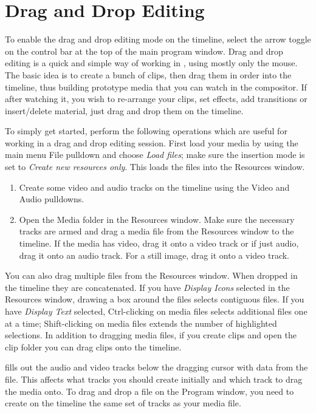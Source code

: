 \section{Drag and Drop Editing}%
\label{sec:drag_drop_editing}

To enable the drag and drop editing mode on the timeline, select the
arrow toggle on the control bar at the top of the main program
window.  Drag and drop editing is a quick and simple way of working
in \CGG{}, using mostly only the mouse. The basic idea is to create
a bunch of clips, then drag them in order into the timeline, thus
building prototype media that you can watch in the compositor. If
after watching it, you wish to re-arrange your clips, set effects,
add transitions or insert/delete material, just drag and drop them
on the timeline.

To simply get started, perform the following operations which are
useful for working in a drag and drop editing session.  First load
your media by using the main menu File pulldown and choose
\textit{Load files}; make sure the insertion mode is set to
\textit{Create new resources only}.  This loads the files into the
Resources window.

\begin{enumerate}
\item Create some video and audio tracks on the timeline using
  the Video and Audio pulldowns.
\item Open the Media folder in the Resources window.  Make sure
  the necessary tracks are armed and drag a media file from the
  Resources window to the timeline. If the media has video, drag it
  onto a video track or if just audio, drag it onto an audio
  track. For a still image, drag it onto a video track.
\end{enumerate}

You can also drag multiple files from the Resources window. When
dropped in the timeline they are concatenated. If you have
\textit{Display Icons} selected in the Resources window, drawing a
box around the files selects contiguous files. If you have
\textit{Display Text} selected, Ctrl-clicking on media files selects
additional files one at a time; Shift-clicking on media files
extends the number of highlighted selections.  In addition to
dragging media files, if you create clips and open the clip folder
you can drag clips onto the timeline.

\CGG{} fills out the audio and video tracks below the dragging
cursor with data from the file. This affects what tracks you should
create initially and which track to drag the media onto. To drag and
drop a file on the Program window, you need to create on the
timeline the same set of tracks as your media file.

